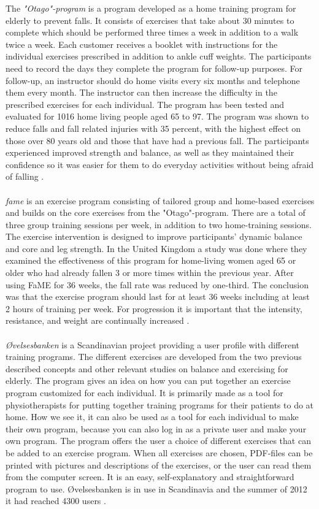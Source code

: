 The \emph{"Otago"-program} is a program developed as a home training program for elderly to prevent falls. It consists of exercises that take about 30 minutes to complete which should be performed three times a week in addition to a walk twice a week. Each customer receives a booklet with instructions for the individual exercises prescribed in addition to ankle cuff weights. The participants need to record the days they complete the program for follow-up purposes. For follow-up, an instructor should do home visits every six months and telephone them every month. The instructor can then increase the difficulty in the prescribed exercises for each individual. The program has been tested and evaluated for 1016 home living people aged 65 to 97. The program was shown to reduce falls and fall related injuries with 35 percent, with the highest effect on those over 80 years old and those that have had a previous fall. The participants experienced improved strength and balance, as well as they maintained their confidence so it was easier for them to do everyday activities without being afraid of falling \cite{otago} \cite{gruppetrening-trheim}.\\ \\
\emph{\ac{fame}} is an exercise program consisting of tailored group and home-based exercises and builds on the core exercises from the "Otago"-program.  There are a total of three group training sessions per week, in addition to two home-training sessions. The exercise intervention is designed to improve participants' dynamic balance and core and leg strength.  In the United Kingdom a study was done where they examined the effectiveness of this program for home-living women aged 65 or older who had already fallen 3 or more times within the previous year. After using FaME for 36 weeks, the fall rate was reduced by one-third. The conclusion was that the exercise program should last for at least 36 weeks including at least 2 hours of training per week. For progression it is important that the intensity, resistance, and weight are continually increased \cite{fame}.\\ \\
\emph{{Ø}velsesbanken} is a Scandinavian project providing a user profile with different training programs. The different exercises are developed from the two previous described concepts and other relevant studies on balance and exercising for elderly. The program gives an idea on how you can put together an exercise program customized for each individual. It is primarily made as a tool for physiotherapists for putting together training programs for their patients to do at home. How we see it, it can also be used as a tool for each individual to make their own program, because you can also log in as a private user and make your own program. The program offers the user a choice of different exercises that can be added to an exercise program. When all exercises are chosen, PDF-files can be printed with pictures and descriptions of the exercises, or the user can read them from the computer screen. It is an easy, self-explanatory and straightforward program to use. {Ø}velsesbanken is in use in Scandinavia and the summer of 2012 it had reached 4300 users \cite{ovelsesbank}.\\ \\
